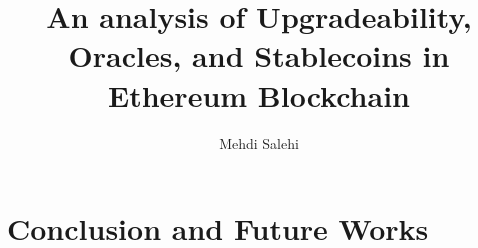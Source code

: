 \documentclass[letterpaper,12pt,onecolumn,final]{report}
\author{Mehdi Salehi}
\title{An analysis of Upgradeability, Oracles, and Stablecoins in Ethereum Blockchain}
\begin{document}
\begin{abstract}
{%

}
\end{abstract}

\begin{acknowledgments}

\end{acknowledgments}













\chapter{Conclusion and Future Works}
\label{chap:conclusion}



\clearpage
{}
{}  %
\singlespacing %





\appendix
\setcounter{table}{0}		%
\setcounter{figure}{0}		%
\renewcommand{\thefigure}{\Alph{chapter}.\arabic{figure}} 	%
\renewcommand{\thetable}{\Alph{chapter}.\arabic{table}}		%
\end{document}
